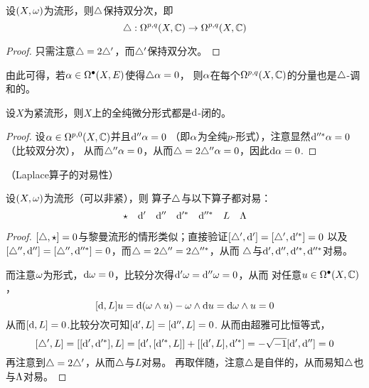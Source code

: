 \begin{cor}
\label{Kahler-Laplace 保持双分次-cor}
设$(X,\omega)$为\Kahler 流形，则$\triangle$保持双分次，即
$$
  \triangle:\Omega^{p,q}(X,\mathbb{C})\to\Omega^{p,q}(X,\mathbb{C})
$$
\end{cor}

\begin{proof}
只需注意$\triangle=2\triangle'$，而$\triangle'$保持双分次。
\end{proof}
由此可得，若$\alpha\in\Omega^{\bullet}(X,E)$使得$\triangle\alpha=0$，
则$\alpha$在每个$\Omega^{p,q}(X,\mathbb{C})$的分量也是$\triangle$-调和的。

\begin{cor}
设$X$为紧\Kahler 流形，则$X$上的全纯微分形式都是$\mathrm{d}$-闭的。
\end{cor}

\begin{proof}
设$\alpha\in\Omega^{p,0}(X,\mathbb{C})$并且$\mathrm{d}''\alpha=0$
（即$\alpha$为全纯$p$-形式），注意显然$\mathrm{d}''^*\alpha=0$（比较双分次），
从而$\triangle''\alpha=0$，从而$\triangle=2\triangle''\alpha=0$，因此$\mathrm{d}\alpha=0$.
\end{proof}

\begin{thm}（Laplace算子的对易性）
\label{紧Kahler-Laplace算子对易性}

设$(X,\omega)$为\Kahler 流形（可以非紧），则
算子$\triangle$与以下算子都对易：
$$
  \star\quad
  \mathrm{d}'\quad
  \mathrm{d}''\quad
  \mathrm{d}'^*\quad
  \mathrm{d}''^*\quad
  L\quad
  \Lambda
$$
\end{thm}

\begin{proof}
$[\triangle,\star]=0$与黎曼流形的情形类似；直接验证$[\triangle',\mathrm{d}']=[\triangle',\mathrm{d}'^*]=0$
以及$[\triangle'',\mathrm{d}'']=[\triangle'',\mathrm{d}''^*]=0$，而$\triangle=2\triangle''=2\triangle''^*$，从而
$\triangle$与$\mathrm{d}',\mathrm{d}'',\mathrm{d}'^*,\mathrm{d}''^*$对易。

而注意$\omega$为\Kahler 形式，$\mathrm{d}\omega=0$，比较分次得$\mathrm{d}'\omega=\mathrm{d}''\omega=0$，从而
对任意$u\in\Omega^{\bullet}(X,\mathbb{C})$，
$$
  [\mathrm{d},L]u
=
  \mathrm{d}(\omega\wedge u)-\omega\wedge\mathrm{d} u
=
  \mathrm{d}\omega\wedge u=0
$$
从而$[\mathrm{d},L]=0$.比较分次可知$[\mathrm{d}',L]=[\mathrm{d}'',L]=0$.
从而由超雅可比恒等式，
$$
  [\triangle',L]=[[\mathrm{d}',\mathrm{d}'^*],L]
=
  [\mathrm{d}',[\mathrm{d}'^*,L]]+[[\mathrm{d}',L],\mathrm{d}'^*]
=
  -\sqrt{-1}[\mathrm{d}',\mathrm{d}'']
=0
$$
再注意到$\triangle=2\triangle'$，从而$\triangle$与$L$对易。
再取伴随，注意$\triangle$是自伴的，从而易知$\triangle$也与$\Lambda$对易。
\end{proof}


